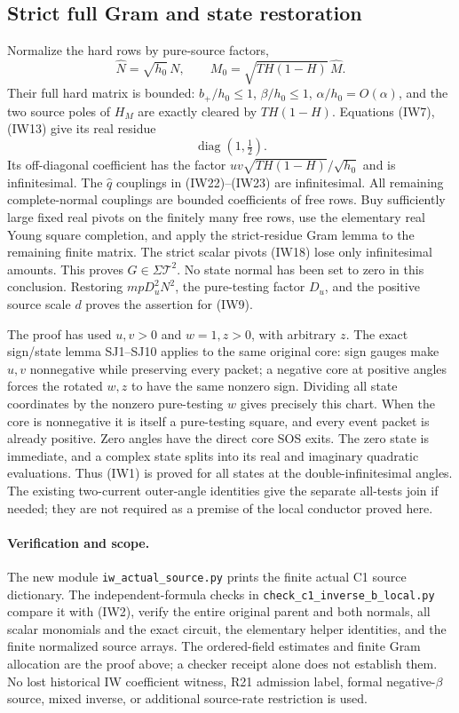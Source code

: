\subsection{Strict full Gram and state restoration}

Normalize the hard rows by pure-source factors,
\[
 \widehat N=\sqrt{h_0}\,N,\qquad
 M_0=\sqrt{TH(1-H)}\,\widehat M.
\]
Their full hard matrix is bounded: $b_+/h_0\leq1$,
$\beta/h_0\leq1$, $\alpha/h_0=O(\alpha)$, and the two
source poles of $H_M$ are exactly cleared by $TH(1-H)$.
Equations (IW7), (IW13) give its real residue
\[
                           \operatorname{diag}(1,\tfrac12).
                                                               \tag{IW24}
\]
Its off-diagonal coefficient has the factor
$uv\sqrt{TH(1-H)}/\sqrt{h_0}$ and is infinitesimal.
The $\widehat q$ couplings in (IW22)--(IW23) are infinitesimal.
All remaining complete-normal couplings are bounded coefficients
of free rows. Buy sufficiently large fixed real pivots on the
finitely many free rows, use the elementary real Young square
completion, and apply the strict-residue Gram lemma to the
remaining finite matrix. The strict scalar pivots (IW18) lose only
infinitesimal amounts. This proves $G\in\Sigma\mathcal T^2$.
No state normal has been set to zero in this conclusion.
Restoring $mpD_u^2N^2$, the pure-testing factor $D_u$, and the
positive source scale $d$ proves the assertion for (IW9).

The proof has used $u,v>0$ and $w=1,z>0$, with arbitrary $z$.
The exact sign/state lemma SJ1--SJ10 applies to the same original
core: sign gauges make $u,v$ nonnegative while preserving every
packet; a negative core at positive angles forces the rotated
$w,z$ to have the same nonzero sign. Dividing all state coordinates
by the nonzero pure-testing $w$ gives precisely this chart.
When the core is nonnegative it is itself a pure-testing square,
and every event packet is already positive. Zero angles have the
direct core SOS exits. The zero state is immediate, and a complex
state splits into its real and imaginary quadratic evaluations.
Thus (IW1) is proved for all states at the double-infinitesimal
angles. The existing two-current outer-angle identities give the
separate all-tests join if needed; they are not required as a premise
of the local conductor proved here.

\paragraph{Verification and scope.}
The new module \texttt{iw\_actual\_source.py} prints the finite
actual C1 source dictionary. The independent-formula checks in
\texttt{check\_c1\_inverse\_b\_local.py} compare it with (IW2),
verify the entire original parent and both normals, all scalar
monomials and the exact circuit, the elementary helper identities,
and the finite normalized source arrays. The ordered-field
estimates and finite Gram allocation are the proof above; a checker
receipt alone does not establish them. No lost historical IW
coefficient witness, R21 admission label, formal negative-$\beta$
source, mixed inverse, or additional source-rate restriction is used.
